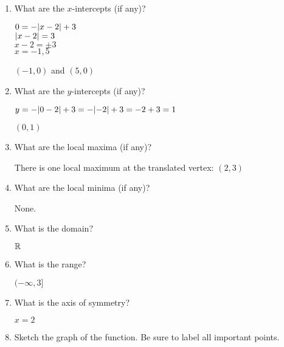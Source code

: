 \documentclass[letterpaper,12pt,fleqn]{article}
\begin{document}
\begin{enumerate}
\begin{enumerate}
  \item What are the $x$-intercepts (if any)?

    $0=-\lvert x-2\rvert+3$ \\
    $\lvert x-2\rvert=3$ \\
    $x-2=\pm3$ \\
    $x=-1,5$

    $(-1,0)$ and $(5,0)$
    
  \item What are the $y$-intercepts (if any)?

    $y=-\lvert0-2\rvert+3=-\lvert-2\rvert+3=-2+3=1$

    $(0,1)$

  \item What are the local maxima (if any)?

    There is one local maximum at the translated vertex: $(2,3)$

  \item What are the local minima (if any)?

    None.

  \item What is the domain?

    $\mathbb{R}$

  \item What is the range?

    $(-\infty,3]$

  \item What is the axis of symmetry?

    $x=2$

  \item Sketch the graph of the function. Be sure to label all important
    points.

    
  \end{enumerate}


\end{enumerate}
\end{document}
